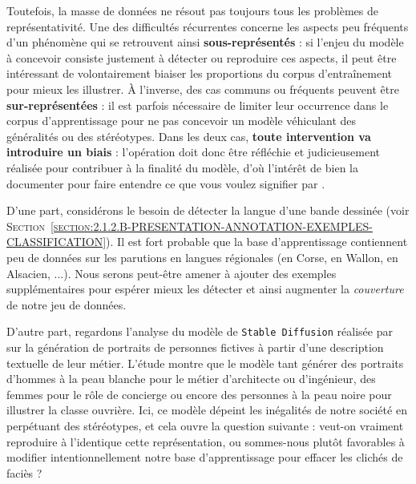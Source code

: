 			Toutefois, la masse de données ne résout pas toujours tous les problèmes de représentativité.
			Une des difficultés récurrentes concerne les aspects peu fréquents d'un phénomène qui se retrouvent ainsi \textbf{sous-représentés} : si l'enjeu du modèle à concevoir consiste justement à détecter ou reproduire ces aspects, il peut être intéressant de volontairement biaiser les proportions du corpus d'entraînement pour mieux les illustrer.
			À l'inverse, des cas communs ou fréquents peuvent être \textbf{sur-représentées} : il est parfois nécessaire de limiter leur occurrence dans le corpus d'apprentissage pour ne pas concevoir un modèle véhiculant des généralités ou des stéréotypes.
			Dans les deux cas, \textbf{toute intervention va introduire un biais} : l'opération doit donc être réfléchie et judicieusement réalisée pour contribuer à la finalité du modèle, d'où l'intérêt de bien la documenter pour faire entendre ce que vous voulez signifier par .
			\begin{leftBarExamples}
				D'une part, considérons le besoin de détecter la langue d'une bande dessinée (voir \textsc{Section~\ref{section:2.1.2.B-PRESENTATION-ANNOTATION-EXEMPLES-CLASSIFICATION}}).
				Il est fort probable que la base d'apprentissage contiennent peu de données sur les parutions en langues régionales (en Corse, en Wallon, en Alsacien, ...).
				Nous serons peut-être amener à ajouter des exemples supplémentaires pour espérer mieux les détecter et ainsi augmenter la \textit{couverture} de notre jeu de données.
				
				D'autre part, regardons l'analyse du modèle de \texttt{Stable Diffusion} réalisée par \cite{nicoletti-bass:2023:generative-ai-takes} sur la génération de portraits de personnes fictives à partir d'une description textuelle de leur métier.
				L'étude montre que le modèle tant générer des portraits d'hommes à la peau blanche pour le métier d'architecte ou d'ingénieur, des femmes pour le rôle de concierge ou encore des personnes à la peau noire pour illustrer la classe ouvrière.
				Ici, ce modèle dépeint les inégalités de notre société en perpétuant des stéréotypes, et cela ouvre la question suivante : veut-on vraiment reproduire à l'identique cette représentation, ou sommes-nous plutôt favorables à modifier intentionnellement notre base d'apprentissage pour effacer les clichés de faciès ?
			\end{leftBarExamples}
